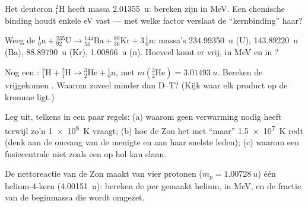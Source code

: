 \begin{exercise}[$\star\star$]\label{exo:g12:nuclear-energy:6}
Het deuteron ${}^{2}_{1}\mathrm{H}$ heeft massa \qty{2.01355}{u}: bereken zijn
 in \unit{MeV}. Een chemische binding houdt enkele \unit{eV}
vast --- met welke factor verslaat de ``kernbinding'' haar?
\end{exercise}

\begin{exercise}[$\star\star$]\label{exo:g12:nuclear-energy:7}
Weeg de  ${}^{1}_{0}\mathrm{n} + {}^{235}_{92}\mathrm{U} \to
{}^{144}_{56}\mathrm{Ba} + {}^{89}_{36}\mathrm{Kr} + 3\,{}^{1}_{0}\mathrm{n}$:
massa's \qty{234.99350}{u} (U), \qty{143.89220}{u} (Ba), \qty{88.89790}{u}
(Kr), \qty{1.00866}{u} (n). Hoeveel  komt er vrij, in \unit{MeV} en in
?
\end{exercise}

\begin{exercise}[$\star\star$]\label{exo:g12:nuclear-energy:8}
Nog een : ${}^{2}_{1}\mathrm{H} + {}^{2}_{1}\mathrm{H} \to
{}^{3}_{2}\mathrm{He} + {}^{1}_{0}\mathrm{n}$, met
$m({}^{3}_{2}\mathrm{He}) = \qty{3.01493}{u}$. Bereken de vrijgekomen .
Waarom zoveel minder dan D--T? (Kijk waar elk product op de kromme ligt.)
\end{exercise}

\begin{exercise}[$\star\star$]\label{exo:g12:nuclear-energy:9}
Leg uit, telkens in een paar regels: (a) waarom  geen verwarming
nodig heeft terwijl  zo'n \qty{1e8}{K} vraagt; (b) hoe de Zon het met
``maar'' \qty{1.5e7}{K} redt (denk aan de omvang van de menigte en aan haar
snelste leden); (c) waarom een fusiecentrale niet zoals een  op
hol kan slaan.
\end{exercise}

\begin{exercise}[$\star\star$]\label{exo:g12:nuclear-energy:10}
De nettoreactie van de Zon maakt van vier protonen ($m_p = \qty{1.00728}{u}$)
één helium-4-kern (\qty{4.00151}{u}): bereken de  per gemaakt helium,
in \unit{MeV}, en de fractie van de beginmassa die wordt omgezet.
\end{exercise}

